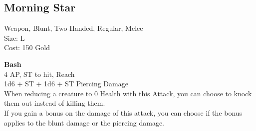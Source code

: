 \subsection{Morning Star}\label{weapon:morningStar}
Weapon, Blunt, Two-Handed, Regular, Melee\\
Size: L\\
Cost: 150 Gold

\textbf{Bash}\\
4 AP, ST to hit,  Reach\\
1d6 + \texttimes ST + 1d6 + \texttimes ST Piercing Damage\\
When reducing a creature to 0 Health with this Attack, you can choose to knock them out instead of killing them.\\
If you gain a bonus on the damage of this attack, you can choose if the bonus applies to the blunt damage or the piercing damage.